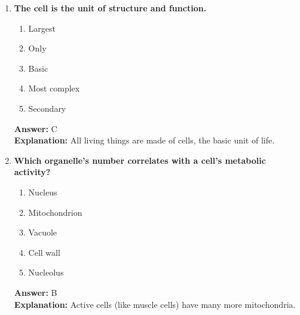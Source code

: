 \documentclass[11pt, a4paper]{article}
\begin{document}
\begin{enumerate}[leftmargin=*, label=\arabic*.]
\item \textbf{The cell is the \underline{\hspace{1cm}} unit of structure and function.}
\begin{enumerate}[label=\Alph*.]
\item Largest
\item Only
\item Basic
\item Most complex
\item Secondary
\end{enumerate}
\textbf{Answer:} C \\
\textbf{Explanation:} All living things are made of cells, the basic unit of life.

\item \textbf{Which organelle's number correlates with a cell's metabolic activity?}
\begin{enumerate}[label=\Alph*.]
\item Nucleus
\item Mitochondrion
\item Vacuole
\item Cell wall
\item Nucleolus
\end{enumerate}
\textbf{Answer:} B \\
\textbf{Explanation:} Active cells (like muscle cells) have many more mitochondria.

\end{enumerate}
\end{document}
